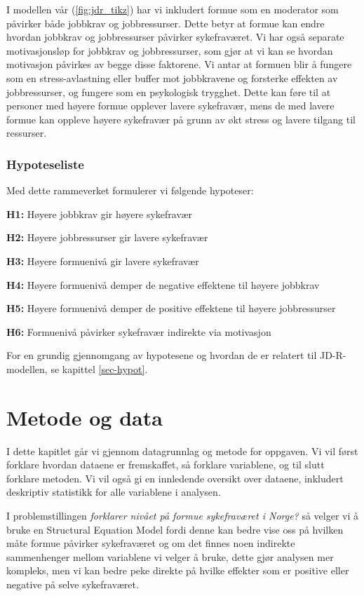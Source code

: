 \documentclass[
  12pt,
  a4paper,
  DIV=11,
  numbers=noendperiod]{scrartcl}
\begin{document}
I modellen vår (\autoref{fig:jdr_tikz}) har vi inkludert formue som en
moderator som påvirker både jobbkrav og jobbressurser. Dette betyr at
formue kan endre hvordan jobbkrav og jobbressurser påvirker
sykefraværet. Vi har også separate motivasjonsløp for jobbkrav og
jobbressurser, som gjør at vi kan se hvordan motivasjon påvirkes av
begge disse faktorene. Vi antar at formuen blir å fungere som en
stress-avlastning eller buffer mot jobbkravene og forsterke effekten av
jobbressurser, og fungere som en psykologisk trygghet. Dette kan føre
til at personer med høyere formue opplever lavere sykefravær, mens de
med lavere formue kan oppleve høyere sykefravær på grunn av økt stress
og lavere tilgang til ressurser.

\subsubsection{Hypoteseliste}\label{hypoteseliste}

Med dette rammeverket formulerer vi følgende hypoteser:

\textbf{H1:} Høyere jobbkrav gir høyere sykefravær

\textbf{H2:} Høyere jobbressurser gir lavere sykefravær

\textbf{H3:} Høyere formuenivå gir lavere sykefravær

\textbf{H4:} Høyere formuenivå demper de negative effektene til høyere
jobbkrav

\textbf{H5:} Høyere formuenivå demper de positive effektene til høyere
jobbressurser

\textbf{H6:} Formuenivå påvirker sykefravær indirekte via motivasjon

For en grundig gjennomgang av hypotesene og hvordan de er relatert til
JD-R-modellen, se kapittel \ref{sec-hypot}.

\section{Metode og data}\label{metode-og-data}

I dette kapitlet går vi gjennom datagrunnlag og metode for oppgaven. Vi
vil først forklare hvordan dataene er fremskaffet, så forklare
variablene, og til slutt forklare metoden. Vi vil også gi en innledende
oversikt over dataene, inkludert deskriptiv statistikk for alle
variablene i analysen.

I problemstillingen \emph{forklarer nivået på formue sykefraværet i
Norge?} så velger vi å bruke en Structural Equation Model fordi denne
kan bedre vise oss på hvilken måte formue påvirker sykefraværet og om
det finnes noen indirekte sammenhenger mellom variablene vi velger å
bruke, dette gjør analysen mer kompleks, men vi kan bedre peke direkte
på hvilke effekter som er positive eller negative på selve sykefraværet.
\end{document}
